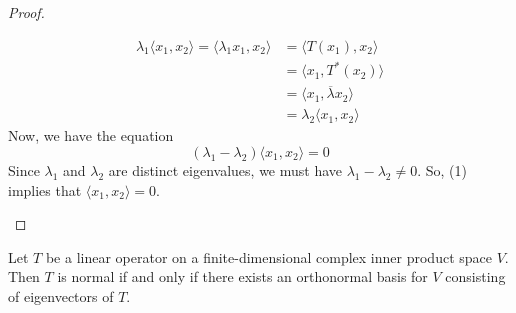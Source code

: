 \begin{proof}
\begin{enumerate}
        \begin{align*}
            {\lambda}_{1} \langle {x}_{1} , {x}_{2} \rangle = \langle {\lambda}_{1} {x}_{1} ,  {x}_{2} \rangle  &= \langle T({x}_{1}) , {x}_{2}  \rangle \\
                                                                                                                &= \langle {x}_{1} ,  T^{*}({x}_{2}) \rangle \\
                                                                                                                &=  \langle {x}_{1}  ,  \overline{\lambda} {x}_{2} \rangle \\
                                                                                                                &= \lambda_2 \langle {x}_{1}  , {x}_{2} \rangle
        \end{align*}
        Now, we have the equation
        \[ ({\lambda}_{1} - {\lambda}_{2}) \langle {x}_{1} , {x}_{2} \rangle = 0 \tag{1}   \]
        Since \( {\lambda}_{1} \) and \( {\lambda}_{2} \) are distinct eigenvalues, we must have \( {\lambda}_{1} - {\lambda}_{2} \neq 0  \). So, (1) implies that \( \langle {x}_{1} , {x}_{2} \rangle = 0 \).
\end{enumerate}
\end{proof}

\begin{theorem}
   Let \( T  \) be a linear operator on a finite-dimensional complex inner product space \( V  \). Then \( T  \) is normal if and only if there exists an orthonormal basis for \( V  \) consisting of eigenvectors of \( T  \).
\end{theorem}

